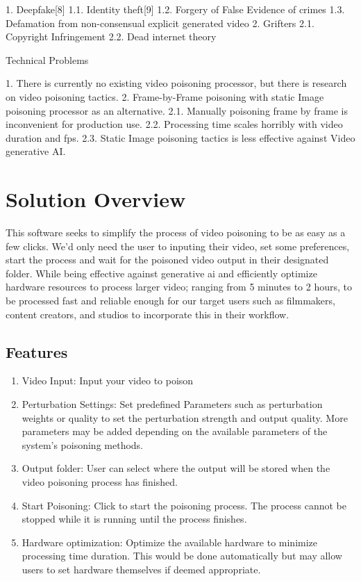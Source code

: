 1. Deepfake[8]
    1.1. Identity theft[9]
    1.2. Forgery of False Evidence of crimes
    1.3. Defamation from non-consensual explicit generated video
2. Grifters
    2.1. Copyright Infringement
    2.2. Dead internet theory 

Technical Problems

1. There is currently no existing video poisoning processor, but there is research on video poisoning tactics.
2. Frame-by-Frame poisoning with static Image poisoning processor as an alternative.
    2.1. Manually poisoning frame by frame is inconvenient for production use.
    2.2. Processing time scales horribly with video duration and fps.
    2.3. Static Image poisoning tactics is less effective against Video generative AI.

\section{Solution Overview}
\label{section:solution-overview}

This software seeks to simplify the process of video poisoning to be as easy as a few clicks.
We'd only need the user to inputing their video, set some preferences, start the process and wait for the poisoned video output in their designated folder.
While being effective against generative ai and efficiently optimize hardware resources to process larger video; ranging from 5 minutes to 2 hours, to be processed fast and reliable enough for our target users such as filmmakers, content creators, and studios to incorporate this in their workflow. 

\subsection{Features}
\label{subsection:features}

\begin{enumerate}[leftmargin=80pt]
    \item Video Input: Input your video to poison
    \item Perturbation Settings: Set predefined Parameters such as perturbation weights or quality to set the perturbation strength and output quality. More parameters may be added depending on the available parameters of the system's poisoning methods.
    \item Output folder: User can select where the output will be stored when the video poisoning process has finished.
    \item Start Poisoning: Click to start the poisoning process. The process cannot be stopped while it is running until the process finishes.
    \item Hardware optimization: Optimize the available hardware to minimize processing time duration. This would be done automatically but may allow users to set hardware themselves if deemed appropriate.
\end{enumerate}

